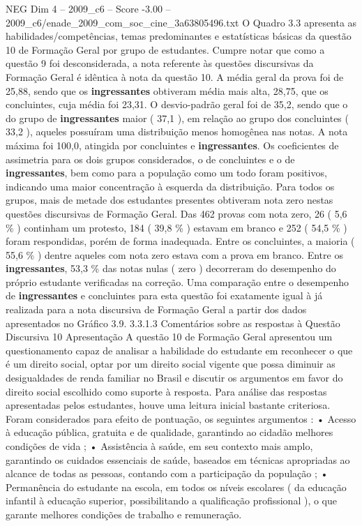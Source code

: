 \begin{textsample}{NEG Dim 4 – 2009\_c6 – Score -3.00 – 2009\_c6/enade\_2009\_com\_soc\_cine\_3a63805496.txt}
O Quadro 3.3 apresenta as habilidades/competências, temas predominantes e estatísticas básicas da questão 10 de Formação Geral por grupo de estudantes.
Cumpre notar que como a questão 9 foi desconsiderada, a nota referente às questões discursivas da Formação Geral é idêntica à nota da questão 10.
A média geral da prova foi de 25,88, sendo que os \textbf{ingressantes} obtiveram média mais alta, 28,75, que os concluintes, cuja média foi 23,31.
O desvio-padrão geral foi de 35,2, sendo que o do grupo de \textbf{ingressantes} maior ( 37,1 ), em relação ao grupo dos concluintes ( 33,2 ), aqueles possuíram uma distribuição menos homogênea nas notas.
A nota máxima foi 100,0, atingida por concluintes e \textbf{ingressantes}.
Os coeficientes de assimetria para os dois grupos considerados, o de concluintes e o de \textbf{ingressantes}, bem como para a população como um todo foram positivos, indicando uma maior concentração à esquerda da distribuição.
Para todos os grupos, mais de metade dos estudantes presentes obtiveram nota zero nestas questões discursivas de Formação Geral.
Das 462 provas com nota zero, 26 ( 5,6 \% ) continham um protesto, 184 ( 39,8 \% ) estavam em branco e 252 ( 54,5 \% ) foram respondidas, porém de forma inadequada.
Entre os concluintes, a maioria ( 55,6 \% ) dentre aqueles com nota zero estava com a prova em branco.
Entre os \textbf{ingressantes}, 53,3 \% das notas nulas ( zero ) decorreram do desempenho do próprio estudante verificadas na correção.
Uma comparação entre o desempenho de \textbf{ingressantes} e concluintes para esta questão foi exatamente igual à já realizada para a nota discursiva de Formação Geral a partir dos dados apresentados no Gráfico 3.9. 3.3.1.3 Comentários sobre as respostas à Questão Discursiva 10 Apresentação A questão 10 de Formação Geral apresentou um questionamento capaz de analisar a habilidade do estudante em reconhecer o que é um direito social, optar por um direito social vigente que possa diminuir as desigualdades de renda familiar no Brasil e discutir os argumentos em favor do direito social escolhido como suporte à resposta.
Para análise das respostas apresentadas pelos estudantes, houve uma leitura inicial bastante criteriosa.
Foram considerados para efeito de pontuação, os seguintes argumentos : • Acesso à educação pública, gratuita e de qualidade, garantindo ao cidadão melhores condições de vida ; • Assistência à saúde, em seu contexto mais amplo, garantindo os cuidados essenciais de saúde, baseados em técnicas apropriadas ao alcance de todas as pessoas, contando com a participação da população ; • Permanência do estudante na escola, em todos os níveis escolares ( da educação infantil à educação superior, possibilitando a qualificação profissional ), o que garante melhores condições de trabalho e remuneração.

\end{textsample}
